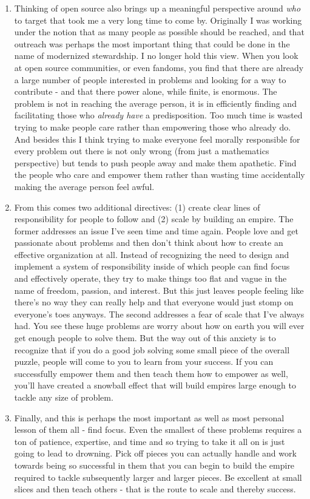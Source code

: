 \documentclass[10pt,a5paper]{book}
\begin{document}
\begin{enumerate}
\item Thinking of open source also brings up a meaningful perspective around \textit{who} to target that took me a very long time to come by. Originally I was working under the notion that as many people as possible should be reached, and that outreach was perhaps the most important thing that could be done in the name of modernized stewardship. I no longer hold this view. When you look at open source communities, or even fandoms, you find that there are already a large number of people interested in problems and looking for a way to contribute - and that there power alone, while finite, is enormous. The problem is not in reaching the average person, it is in efficiently finding and facilitating those who \textit{already have} a predisposition. Too much time is wasted trying to make people care rather than empowering those who already do. And besides this I think trying to make everyone feel morally responsible for every problem out there is not only wrong (from just a mathematics perspective) but tends to push people away and make them apathetic. Find the people who care and empower them rather than wasting time accidentally making the average person feel awful. 
\item From this comes two additional directives: (1) create clear lines of responsibility for people to follow and (2) scale by building an empire. The former addresses an issue I've seen time and time again. People love and get passionate about problems and then don't think about how to create an effective organization at all. Instead of recognizing the need to design and implement a system of responsibility inside of which people can find focus and effectively operate, they try to make things too flat and vague in the name of freedom, passion, and interest. But this just leaves people feeling like there's no way they can really help and that everyone would just stomp on everyone's toes anyways. The second addresses a fear of scale that I've always had. You see these huge problems are worry about how on earth you will ever get enough people to solve them. But the way out of this anxiety is to recognize that if you do a good job solving some small piece of the overall puzzle, people will come to you to learn from your success. If you can successfully empower them and then teach them how to empower as well, you'll have created a snowball effect that will build empires large enough to tackle any size of problem. 
\item Finally, and this is perhaps the most important as well as most personal lesson of them all - find focus. Even the smallest of these problems requires a ton of patience, expertise, and time and so trying to take it all on is just going to lead to drowning. Pick off pieces you can actually handle and work towards being so successful in them that you can begin to build the empire required to tackle subsequently larger and larger pieces. Be excellent at small slices and then teach others - that is the route to scale and thereby success. 
\end{enumerate}
\end{document}
